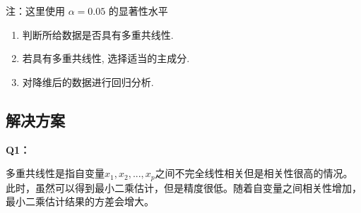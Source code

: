 \documentclass[11pt]{ctexart}
\providecommand{\tightlist}{%
      \setlength{\itemsep}{0pt}\setlength{\parskip}{0pt}}
\begin{document}
注：这里使用 \(\alpha=0.05\) 的显著性水平

\begin{enumerate}
\def\labelenumi{\arabic{enumi}.}
\tightlist
\item
  判断所给数据是否具有多重共线性.
\item
  若具有多重共线性, 选择适当的主成分.
\item
  对降维后的数据进行回归分析.
\end{enumerate}

\hypertarget{ux89e3ux51b3ux65b9ux6848}{%
\subsection{解决方案}\label{ux89e3ux51b3ux65b9ux6848}}

    \textbf{Q1：}

多重共线性是指自变量\(x_1, x_2, ... ,x_p\)之间不完全线性相关但是相关性很高的情况。此时，虽然可以得到最小二乘估计，但是精度很低。随着自变量之间相关性增加，最小二乘估计结果的方差会增大。
\end{document}
